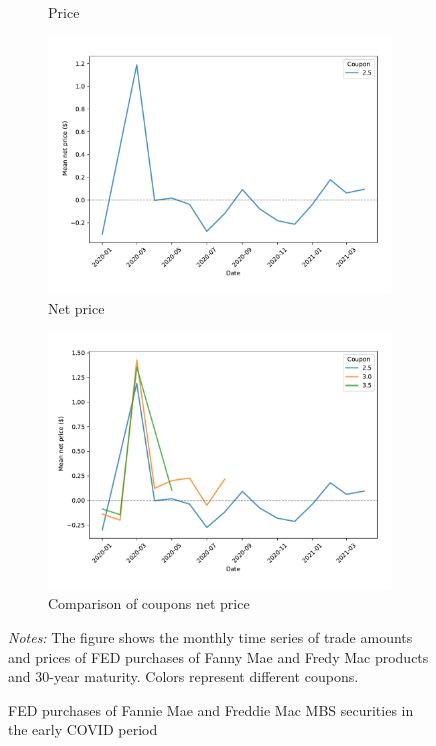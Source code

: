 \documentclass[11pt,a4paper]{article}
\begin{document}
\begin{figure}[h]
\begin{subfigure}[b]{0.49\textwidth}
    \caption{ Price }
   \end{subfigure}
   \begin{subfigure}[b]{0.49\textwidth}
    \includegraphics[width=0.998\textwidth]{../results/figures/fed_price_mean_mat30_loan1_timeseries_cpmonthly_normalized_coup2.5}
    \caption{ Net price}
   \end{subfigure}
   \begin{subfigure}[b]{0.49\textwidth}
    \includegraphics[width=0.998\textwidth]{../results/figures/fed_price_mean_mat30_loan1_timeseries_cpmonthly_normalized}
    \caption{ Comparison of coupons net price }
   \end{subfigure}
   \caption{FED purchases of Fannie Mae and Freddie Mac MBS securities  in the early COVID period} 
   \begin{minipage}{\textwidth}
      \footnotesize{\textit{Notes:} The figure shows the monthly time series of trade amounts and prices of FED purchases of Fanny Mae and Fredy Mac products and 30-year maturity. Colors represent different coupons. } 
      \end{minipage}
\end{figure}
\end{document}
